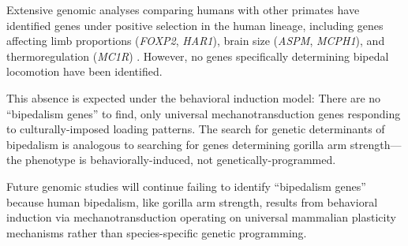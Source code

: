 Extensive genomic analyses comparing humans with other primates have identified genes under positive selection in the human lineage, including genes affecting limb proportions (\textit{FOXP2}, \textit{HAR1}), brain size (\textit{ASPM}, \textit{MCPH1}), and thermoregulation (\textit{MC1R}) \citep{varki2008comparing,sabeti2006positive}. However, no genes specifically determining bipedal locomotion have been identified.

This absence is expected under the behavioral induction model: There are no ``bipedalism genes'' to find, only universal mechanotransduction genes responding to culturally-imposed loading patterns. The search for genetic determinants of bipedalism is analogous to searching for genes determining gorilla arm strength—the phenotype is behaviorally-induced, not genetically-programmed.

Future genomic studies will continue failing to identify ``bipedalism genes'' because human bipedalism, like gorilla arm strength, results from behavioral induction via mechanotransduction operating on universal mammalian plasticity mechanisms rather than species-specific genetic programming.
